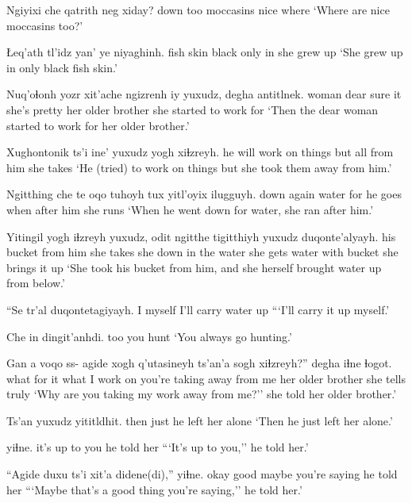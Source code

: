 \documentclass[12pt]{article}
\begin{document}
\gll Ngiyixi che {qatrith} neg xiday?
down    too moccasins nice where
\glt `Where are nice moccasins too?'
\glend

\gll Łeq'ath   tl'idz yan' ye niyaghinh.
{fish skin} black  only in {she grew up}
\glt `She grew up in only black fish skin.'
\glend

\gll Nuq'oɬonh yozr xit'ache ngizrenh iy yuxudz, degha             antitlnek.
woman     dear sure    it  {she's pretty} {}       {her older brother} {she started to work for}
\glt `Then the dear woman started to work for her older brother.'
\glend

\gll Xughontonik ts'i       ine' yuxudz yogh     xiɬzreyh. 
{he will work on things} {} but  all  {from him} {she takes}
\glt `He (tried) to work on things but she took them away from him.'
\glend

\gll Ngitthing che   te    oqo tuhoyh  tux  yitl'oyix ilugguyh. 
down      again water for {he goes} when {after him} {she runs}
\glt `When he went down for water, she ran after him.'
\glend

\gll Yitingil   yogh     iɬzreyh yuxudz, odit ngitthe          tigitthiyh     yuxudz duqonte'alyayh. 
{his bucket} {from him} {she takes} {} she {down in the water} {she gets water with bucket} {} {she brings it up}
\glt `She took his bucket from him, and she herself brought water up from below.'
\glend

\gll ``Se tr'al  duqontetagiyayh.
I  myself  {I'll carry water up}
\glt ```I'll carry it up myself.'
\glend

\gll Che {in dingit'anhdi.    }
 too  {you hunt}
\glt `You always go hunting.'
\glend

\gll Gan a voqo   ss- agide {xogh q'utasineyh} ts'an'a {sogh xiɬzreyh?}''             degha             iɬne ɬogot.
what {} {for it} {} {} {what I work on}   {}   {you're taking away from me} {her older brother} {she tells} truly
\glt `Why are you taking my work away from me?'' she told her older brother.'
\glend

\gll Ts'an yuxudz yititldhit.
then  just   {he left her alone}
\glt `Then he just left her alone.'
\glend

  yiɬne.
{it's up to you} {he told her} 
\glt ```It's up to you,'' he told her.'
\glend

\gll  ``Agide duxu ts'i xit'a didene(di),''     yiɬne.
okay good {} maybe {you're saying} {he told her}
\glt ```Maybe that's a good thing you're saying,'' he told her.'
\glend
\end{document}
